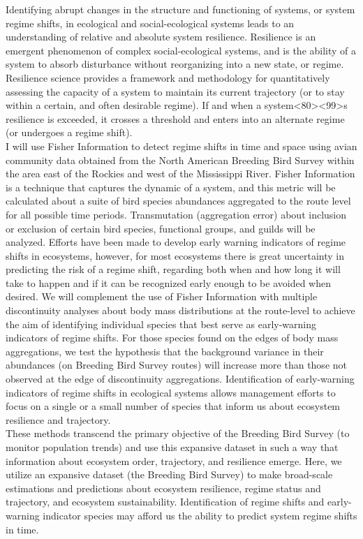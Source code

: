 \documentclass[12pt,twoside,openany]{reedthesis}
\begin{document}
Identifying abrupt changes in the structure and functioning of systems,
or system regime shifts, in ecological and social-ecological systems
leads to an understanding of relative and absolute system resilience.
Resilience is an emergent phenomenon of complex social-ecological
systems, and is the ability of a system to absorb disturbance without
reorganizing into a new state, or regime. Resilience science provides a
framework and methodology for quantitatively assessing the capacity of a
system to maintain its current trajectory (or to stay within a certain,
and often desirable regime). If and when a
system\textless{}80\textgreater{}\textless{}99\textgreater{}s resilience
is exceeded, it crosses a threshold and enters into an alternate regime
(or undergoes a regime shift).\\
I will use Fisher Information to detect regime shifts in time and space
using avian community data obtained from the North American Breeding
Bird Survey within the area east of the Rockies and west of the
Mississippi River. Fisher Information is a technique that captures the
dynamic of a system, and this metric will be calculated about a suite of
bird species abundances aggregated to the route level for all possible
time periods. Transmutation (aggregation error) about inclusion or
exclusion of certain bird species, functional groups, and guilds will be
analyzed. Efforts have been made to develop early warning indicators of
regime shifts in ecosystems, however, for most ecosystems there is great
uncertainty in predicting the risk of a regime shift, regarding both
when and how long it will take to happen and if it can be recognized
early enough to be avoided when desired. We will complement the use of
Fisher Information with multiple discontinuity analyses about body mass
distributions at the route-level to achieve the aim of identifying
individual species that best serve as early-warning indicators of regime
shifts. For those species found on the edges of body mass aggregations,
we test the hypothesis that the background variance in their abundances
(on Breeding Bird Survey routes) will increase more than those not
observed at the edge of discontinuity aggregations. Identification of
early-warning indicators of regime shifts in ecological systems allows
management efforts to focus on a single or a small number of species
that inform us about ecosystem resilience and trajectory.\\
These methods transcend the primary objective of the Breeding Bird
Survey (to monitor population trends) and use this expansive dataset in
such a way that information about ecosystem order, trajectory, and
resilience emerge. Here, we utilize an expansive dataset (the Breeding
Bird Survey) to make broad-scale estimations and predictions about
ecosystem resilience, regime status and trajectory, and ecosystem
sustainability. Identification of regime shifts and early-warning
indicator species may afford us the ability to predict system regime
shifts in time.
\end{document}
